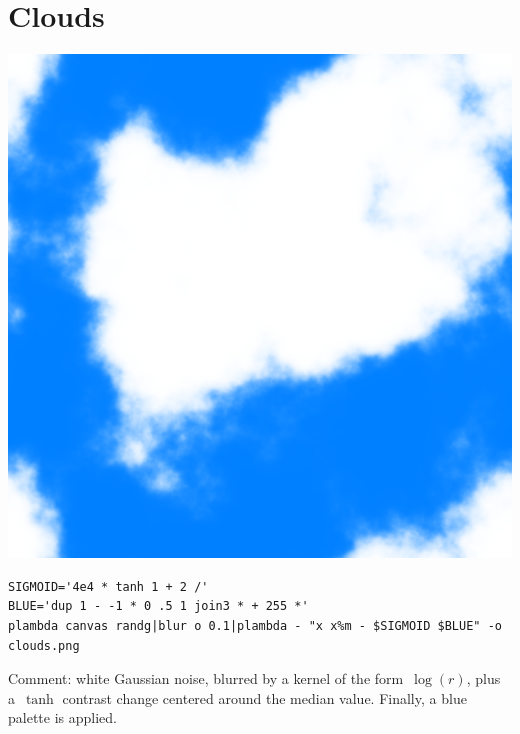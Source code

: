 \section{Clouds}
\includegraphics{clouds.png}
\begin{verbatim}
SIGMOID='4e4 * tanh 1 + 2 /'
BLUE='dup 1 - -1 * 0 .5 1 join3 * + 255 *'
plambda canvas randg|blur o 0.1|plambda - "x x%m - $SIGMOID $BLUE" -o clouds.png
\end{verbatim}
Comment: white Gaussian noise, blurred by a kernel of the form~$\log(r)$, plus a~$\tanh$ contrast change centered around the median value.  Finally, a blue palette is applied.

